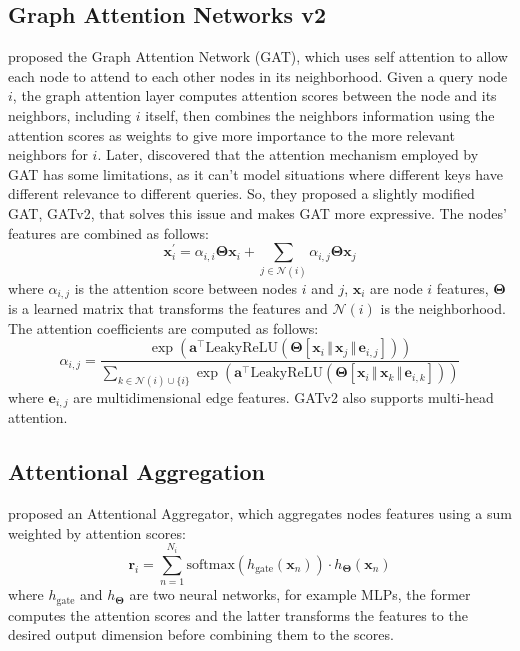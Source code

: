 \documentclass[journal]{IEEEtran}
\begin{document}
\subsection{Graph Attention Networks v2}
\label{sec:gatv2}
\citet{velickovic2017gat} proposed the Graph Attention Network (GAT), which uses self attention to allow each node to attend to each other nodes in its neighborhood.
Given a query node $i$, the graph attention layer computes attention scores between the node and its neighbors, including $i$ itself, then combines the neighbors information using the attention scores as weights to give more importance to the more relevant neighbors for $i$.
Later, \citet{brody2021gatv2} discovered that the attention mechanism employed by GAT has some limitations, as it can't model situations where different keys have different relevance to different queries.
So, they proposed a slightly modified GAT, GATv2, that solves this issue and makes GAT more expressive.
The nodes' features are combined as follows:
\begin{equation}
    \mathbf{x}^{\prime}_i = \alpha_{i,i}\mathbf{\Theta}\mathbf{x}_{i} + \sum_{j \in \mathcal{N}(i)} \alpha_{i,j}\mathbf{\Theta}\mathbf{x}_{j}
\end{equation}
where $\alpha_{i,j}$ is the attention score between nodes $i$ and $j$, $\mathbf{x}_{i}$ are node $i$ features, $\mathbf{\Theta}$ is a learned matrix that transforms the features and $\mathcal{N}(i)$ is the neighborhood.
The attention coefficients are computed as follows:
\begin{equation}
    \alpha_{i,j} = \frac{\exp\left(\mathbf{a}^{\top}\mathrm{LeakyReLU}\left(\mathbf{\Theta} [\mathbf{x}_i \, \Vert \, \mathbf{x}_j \, \Vert \, \mathbf{e}_{i,j}] \right)\right)} {\sum_{k \in \mathcal{N}(i) \cup \{ i \}} \exp\left(\mathbf{a}^{\top}\mathrm{LeakyReLU}\left(\mathbf{\Theta} [\mathbf{x}_i \, \Vert \, \mathbf{x}_k \, \Vert \, \mathbf{e}_{i,k}] \right)\right)}
\end{equation}
where $\mathbf{e}_{i,j}$ are multidimensional edge features.
GATv2 also supports multi-head attention.


\subsection{Attentional Aggregation}
\label{sec:attnaggr}
\citet{li2019attnaggr} proposed an Attentional Aggregator, which aggregates nodes features using a sum weighted by attention scores:
\begin{equation}
    \mathbf{r}_i = \sum_{n=1}^{N_i} \mathrm{softmax} \left(h_{\mathrm{gate}} ( \mathbf{x}_n ) \right) \cdot h_{\mathbf{\Theta}} ( \mathbf{x}_n )
\end{equation}
where $h_{\mathrm{gate}}$ and $h_{\mathbf{\Theta}}$ are two neural networks, for example MLPs, the former computes the attention scores and the latter transforms the features to the desired output dimension before combining them to the scores.
\end{document}
